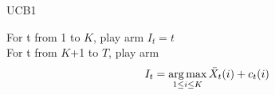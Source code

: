 
\begin{algorithm}
    \caption{UCB1}
    For t from 1 to $K$, play arm $I_t = t$ \\
    For t from $K$+1 to $T$, play arm 
    $$ I_t = \operatorname*{arg\,max}_{1\leq i \leq K} \bar X_t(i) + c_t(i)$$

\end{algorithm}
